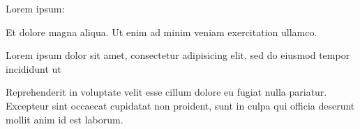 \documentclass{article}
\begin{document}
\begin{ClozeTest}
Lorem ipsum: 
\end{ClozeTest}

Et dolore magna aliqua. Ut enim ad minim veniam exercitation ullamco.

\begin{ClozeTest}
Lorem ipsum dolor sit amet, consectetur adipisicing elit, sed do eiusmod
tempor incididunt ut 
\end{ClozeTest}

Reprehenderit in voluptate velit esse cillum dolore eu fugiat nulla
pariatur. Excepteur sint occaecat cupidatat non proident, sunt in culpa
qui officia deserunt mollit anim id est laborum.

\end{document}
